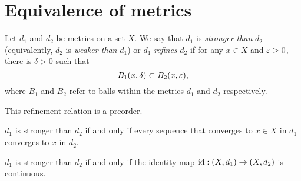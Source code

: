 \documentclass{../note}
\begin{document}
\section{Equivalence of metrics}
\begin{prb}
Let $d_1$ and $d_2$ be metrics on a set $X$.
We say that $d_1$ is \emph{stronger than} $d_2$ (equivalently, $d_2$ is \emph{weaker than} $d_1$) or $d_1$ \emph{refines} $d_2$ if for any $x\in X$ and $\varepsilon>0$, there is $\delta>0$ such that
\[B_1(x,\delta)\subset B_2(x,\varepsilon),\]
where $B_1$ and $B_2$ refer to balls within the metrics $d_1$ and $d_2$ respectively.
\begin{parts}
\item
This refinement relation is a preorder.
\item
$d_1$ is stronger than $d_2$ if and only if every sequence that converges to $x\in X$ in $d_1$ converges to $x$ in $d_2$.
\item
$d_1$ is stronger than $d_2$ if and only if the identity map $\operatorname{id}:(X,d_1)\to(X,d_2)$ is continuous.
\end{parts}
\end{prb}
\end{document}
